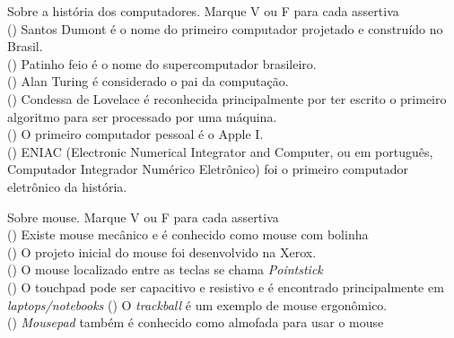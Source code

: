 \documentclass[12pt]{exam}
\begin{document}
\noindent
%
\begin{questions}
\question Sobre a história dos computadores. Marque V ou F para cada assertiva\\
(\hspace{6px}) Santos Dumont é o nome do primeiro computador projetado e construído no Brasil. \\
(\hspace{6px}) Patinho feio é o nome do supercomputador brasileiro. \\
(\hspace{6px}) Alan Turing é considerado o pai da computação. \\
(\hspace{6px}) Condessa de Lovelace é reconhecida principalmente por ter escrito o primeiro algoritmo para ser processado por uma máquina.\\
(\hspace{6px}) O primeiro computador pessoal é o Apple I. \\
(\hspace{6px}) ENIAC (Electronic Numerical Integrator and Computer, ou em português, Computador Integrador Numérico Eletrônico) foi o primeiro computador eletrônico da história. 


\question Sobre mouse. Marque V ou F para cada assertiva\\
(\hspace{6px}) Existe mouse mecânico e é conhecido como mouse com bolinha \\
(\hspace{6px}) O projeto inicial do mouse foi desenvolvido na Xerox. \\
(\hspace{6px}) O mouse localizado entre as teclas se chama \textit{Pointstick} \\
(\hspace{6px}) O touchpad pode ser capacitivo e resistivo e é encontrado principalmente em \textit{laptops/notebooks}
(\hspace{6px}) O \textit{trackball} é um exemplo de mouse ergonômico. \\
(\hspace{6px}) \textit{Mousepad} também é conhecido como almofada para usar o mouse



\end{questions}
\end{document}
